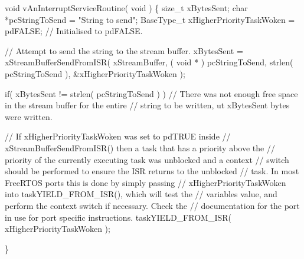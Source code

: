 \begin{DoxyPre}void vAnInterruptServiceRoutine( void )
\{
size\_t xBytesSent;
char *pcStringToSend = "String to send";
BaseType\_t xHigherPriorityTaskWoken = pdFALSE; // Initialised to pdFALSE.
\begin{DoxyVerb}// Attempt to send the string to the stream buffer.
xBytesSent = xStreamBufferSendFromISR( xStreamBuffer,
                                       ( void * ) pcStringToSend,
                                       strlen( pcStringToSend ),
                                       &xHigherPriorityTaskWoken );

if( xBytesSent != strlen( pcStringToSend ) )
{
    // There was not enough free space in the stream buffer for the entire
    // string to be written, ut xBytesSent bytes were written.
}

// If xHigherPriorityTaskWoken was set to pdTRUE inside
// xStreamBufferSendFromISR() then a task that has a priority above the
// priority of the currently executing task was unblocked and a context
// switch should be performed to ensure the ISR returns to the unblocked
// task.  In most FreeRTOS ports this is done by simply passing
// xHigherPriorityTaskWoken into taskYIELD_FROM_ISR(), which will test the
// variables value, and perform the context switch if necessary.  Check the
// documentation for the port in use for port specific instructions.
taskYIELD_FROM_ISR( xHigherPriorityTaskWoken );
\end{DoxyVerb}

\}
\end{DoxyPre}
 